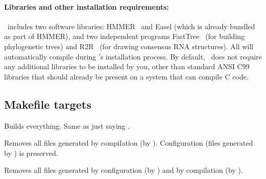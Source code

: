 \paragraph{Libraries and other installation requirements:} \rscape\ includes
two software libraries: HMMER~\citep{Eddy11} and Easel (which is
already bundled as part of HMMER), and two independent programs
FastTree~\citep{Price10} (for building phylogenetic trees) and
R2R~\citep{WeinbergBreaker11} (for drawing consensus RNA
structures). All will automatically compile during \rscape's
installation process.  By default, \rscape\ does not require any
additional libraries to be installed by you, other than standard ANSI
C99 libraries that should already be present on a system that can
compile C code.

\subsection{Makefile targets}

\begin{sreitems}{}

\item[\emprog{all}]
  Builds everything. Same as just saying .

\item[\emprog{clean}]
  Removes all files generated by compilation (by
  ). Configuration (files generated by
  ) is preserved.

\item[\emprog{distclean}]
  Removes all files generated by configuration (by )
  and by compilation (by ). 

\end{sreitems}

